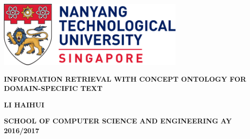 \begin{titlepage}
\begin{center}

\includegraphics[width=0.7\textwidth]{./ntu_logo.png}
\vspace{4cm}

\uppercase{\textbf{Information Retrieval with Concept Ontology for Domain-Specific Text}}
\vspace{3cm}

\uppercase{\textbf{Li Haihui}}
\vfill

\textbf{SCHOOL OF COMPUTER SCIENCE AND ENGINEERING}
\linebreak
\textbf{AY 2016/2017}

\end{center}
\end{titlepage}